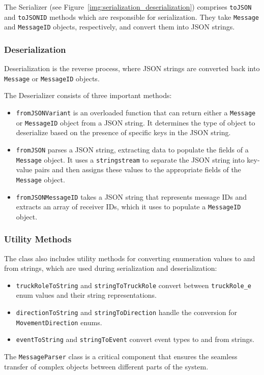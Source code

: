 The Serializer (see Figure~\ref{img:serialization_deserialization}) comprises \texttt{toJSON} and \texttt{toJSONID} methods which are responsible for serialization. They take \texttt{Message} and \texttt{MessageID} objects, respectively, and convert them into JSON strings.

\subsubsection{Deserialization}
Deserialization is the reverse process, where JSON strings are converted back into \texttt{Message} or \texttt{MessageID} objects.

The Deserializer consists of three important methods:

\begin{itemize}
    \item \texttt{fromJSONVariant} is an overloaded function that can return either a \texttt{Message} or \texttt{MessageID} object from a JSON string. It determines the type of object to deserialize based on the presence of specific keys in the JSON string.

    \item \texttt{fromJSON} parses a JSON string, extracting data to populate the fields of a \texttt{Message} object. It uses a \texttt{stringstream} to separate the JSON string into key-value pairs and then assigns these values to the appropriate fields of the \texttt{Message} object.
    
    \item \texttt{fromJSONMessageID} takes a JSON string that represents message IDs and extracts an array of receiver IDs, which it uses to populate a \texttt{MessageID} object.
    
\end{itemize}

\subsubsection{Utility Methods}
The class also includes utility methods for converting enumeration values to and from strings, which are used during serialization and deserialization:

\begin{itemize}
    \item \texttt{truckRoleToString} and \texttt{stringToTruckRole} convert between \texttt{truckRole\_e} enum values and their string representations.
    
    \item \texttt{directionToString} and \texttt{stringToDirection} handle the conversion for \texttt{MovementDirection} enums.
    
    \item \texttt{eventToString} and \texttt{stringToEvent} convert event types to and from strings.
\end{itemize}

The \texttt{MessageParser} class is a critical component that ensures the seamless transfer of complex objects between different parts of the system.
